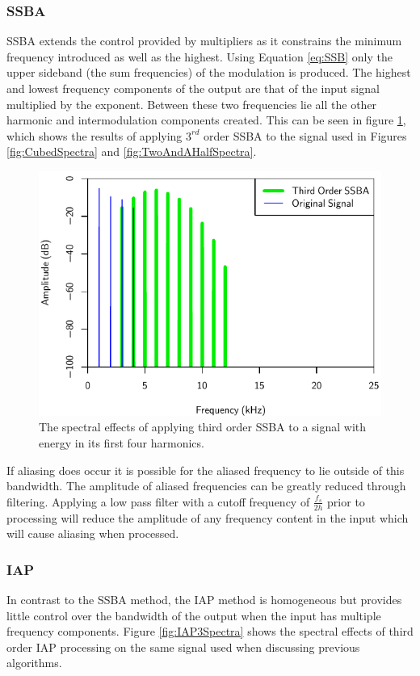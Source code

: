 		\subsubsection*{SSBA}
			SSBA extends the control provided by multipliers as it constrains the minimum frequency introduced
			as well as the highest. Using Equation \ref{eq:SSB} only the upper sideband (the sum frequencies)
			of the modulation is produced. The highest and lowest frequency components of the output are that
			of the input signal multiplied by the exponent. Between these two frequencies lie all the other
			harmonic and intermodulation components created. This can be seen in figure \ref{fig:SSBA3Spectra},
			which shows the results of applying $3^{rd}$ order SSBA to the signal used in Figures
			\ref{fig:CubedSpectra} and \ref{fig:TwoAndAHalfSpectra}. 			
			
			\begin{figure}[h!]
				\centering
				\includegraphics{chapter5/Images/SSBA3Spectra.pdf}
				\caption{The spectral effects of applying third order SSBA to a signal with energy in its 
				         first four harmonics.}
				\label{fig:SSBA3Spectra}
			\end{figure}

			If aliasing does occur it is possible for the aliased frequency to lie outside of this bandwidth.
			The amplitude of aliased frequencies can be greatly reduced through filtering. Applying a low pass
			filter with a cutoff frequency of $\frac{f_{s}}{2h}$ prior to processing will reduce the amplitude
			of any frequency content in the input which will cause aliasing when processed.

		\subsubsection*{IAP}
			In contrast to the SSBA method, the IAP method is homogeneous but provides little control over the
			bandwidth of the output when the input has multiple frequency components. Figure
			\ref{fig:IAP3Spectra} shows the spectral effects of third order IAP processing on the same signal
			used when discussing previous algorithms.

